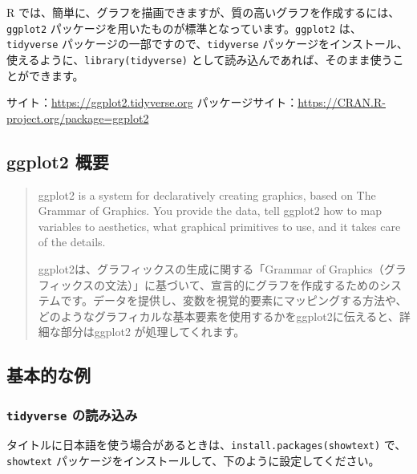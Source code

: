 \documentclass[
  xelatex, ja=standard]{bxjsbook}
\theoremstyle{definition}
\theoremstyle{definition}
\theoremstyle{definition}
\theoremstyle{definition}
\theoremstyle{remark}
\begin{document}
R では、簡単に、グラフを描画できますが、質の高いグラフを作成するには、\texttt{ggplot2} パッケージを用いたものが標準となっています。\texttt{ggplot2} は、\texttt{tidyverse} パッケージの一部ですので、\texttt{tidyverse} パッケージをインストール、使えるように、\texttt{library(tidyverse)} として読み込んであれば、そのまま使うことができます。

サイト：\url{https://ggplot2.tidyverse.org} パッケージサイト：\url{https://CRAN.R-project.org/package=ggplot2}

\hypertarget{ggplot2-ux6982ux8981-1}{%
\subsection{ggplot2 概要}\label{ggplot2-ux6982ux8981-1}}

\begin{quote}
ggplot2 is a system for declaratively creating graphics, based on The Grammar of Graphics. You provide the data, tell ggplot2 how to map variables to aesthetics, what graphical primitives to use, and it takes care of the details.

ggplot2は、グラフィックスの生成に関する「Grammar of Graphics（グラフィックスの文法）」に基づいて、宣言的にグラフを作成するためのシステムです。データを提供し、変数を視覚的要素にマッピングする方法や、どのようなグラフィカルな基本要素を使用するかをggplot2に伝えると、詳細な部分はggplot2 が処理してくれます。
\end{quote}

\hypertarget{ux57faux672cux7684ux306aux4f8b}{%
\subsection{基本的な例}\label{ux57faux672cux7684ux306aux4f8b}}

\hypertarget{tidyverse-ux306eux8aadux307fux8fbcux307f}{%
\subsubsection{\texorpdfstring{\texttt{tidyverse} の読み込み}{tidyverse の読み込み}}\label{tidyverse-ux306eux8aadux307fux8fbcux307f}}

タイトルに日本語を使う場合があるときは、\texttt{install.packages(\textquotesingle{}showtext\textquotesingle{})} で、\texttt{showtext} パッケージをインストールして、下のように設定してください。
\end{document}
